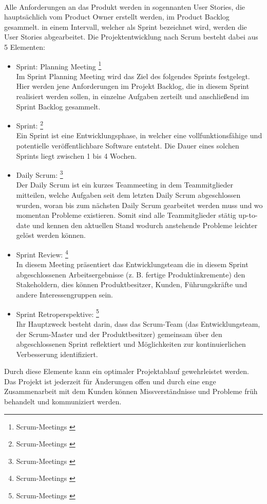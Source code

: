 \\
\noindent Alle Anforderungen an das Produkt werden in sogennanten User Stories, die hauptsächlich
vom Product Owner erstellt werden, im Product Backlog gesammelt. in einem Intervall, welcher
als Sprint bezeichnet wird, werden die User Stories abgearbeitet. Die Projektentwicklung
nach Scrum besteht dabei aus 5 Elementen:
\begin{itemize}
    \item Sprint: Planning Meeting \footnote{Scrum-Meetings \cite{Sprint-planing-meeting}}\\
    Im Sprint Planning Meeting wird das Ziel des folgendes Sprints festgelegt. Hier werden
    jene Anforderungen im Projekt Backlog, die in diesem Sprint realisiert werden sollen,
    in einzelne Aufgaben zerteilt und anschließend im Sprint Backlog gesammelt.
    \item Sprint: \footnote{Scrum-Meetings \cite{Sprint}} \\
    Ein Sprint ist eine Entwicklungsphase, in welcher eine vollfunktionsfähige und potentielle
    veröffentlichbare Software entsteht. Die Dauer eines solchen Sprints liegt zwischen
    1 bis 4 Wochen.
    \item Daily Scrum: \footnote{Scrum-Meetings \cite{Daily-Scrum}}\\
    Der Daily Scrum ist ein kurzes Teammeeting in dem Teammitglieder mitteilen, welche
    Aufgaben seit dem letzten Daily Scrum abgeschlossen wurden, woran bis zum nächsten
    Daily Scrum gearbeitet werden muss und wo momentan Probleme existieren. Somit sind alle
    Teammitglieder stätig up-to-date und kennen den aktuellen Stand wodurch anstehende Probleme
    leichter gelöst werden können.
    \item Sprint Review: \footnote{Scrum-Meetings \cite{Sprint-Review}}\\
    In diesem Meeting präsentiert das Entwicklungsteam die in diesem Sprint abgeschlossenen
    Arbeitsergebnisse (z. B. fertige Produktinkremente) den Stakeholdern, dies können
    Produktbesitzer, Kunden, Führungskräfte und andere Interessengruppen sein.
    \item Sprint Retroperspektive: \footnote{Scrum-Meetings \cite{Sprint-Retroperspektiv}} \\
    Ihr Hauptzweck besteht darin, dass das Scrum-Team (das Entwicklungsteam, der Scrum-Master
    und der Produktbesitzer) gemeinsam über den abgeschlossenen Sprint reflektiert und
    Möglichkeiten zur kontinuierlichen Verbesserung identifiziert.
\end{itemize}
\noindent Durch diese Elemente kann ein optimaler Projektablauf gewehrleistet werden. Das
Projekt ist jederzeit für Änderungen offen und durch eine enge Zusammenarbeit mit dem Kunden
können Missverständnisse und Probleme früh behandelt und kommuniziert werden.

